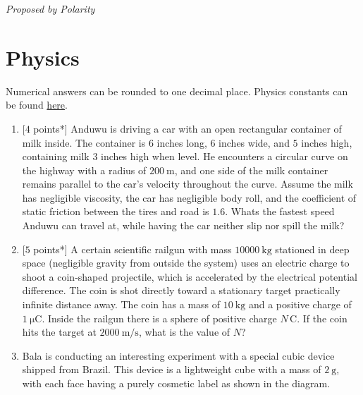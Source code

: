 \begin{enumerate}[align=left,start=1,label=\textbf{\textcolor{meablue}{Problem \arabic*}}]
    \textrm{\emph{Proposed by Polarity}}

    \begin{solution}
        
    \end{solution}
\end{enumerate}
 
\newpage 
{}

\section*{\textsf{\textbf{\textcolor{meared}{Physics}}}}
Numerical answers can be rounded to one decimal place. Physics constants can be found \href{https://en.wikipedia.org/wiki/List_of_physical_constants}{here}.
\begin{enumerate}[align=left,start=1,label=\textbf{\textcolor{meared}{Problem \arabic*}}]
    \item {[$4$ points*]}
        Anduwu is driving a car with an open rectangular container of milk inside. The container is $6$ inches long, $6$ inches wide, and $5$ inches high, containing milk $3$ inches high when level. He encounters a circular curve on the highway with a radius of $\qty{200}{\meter}$, and one side of the milk container remains parallel to the car's velocity throughout the curve. Assume the milk has negligible viscosity, the car has negligible body roll, and the coefficient of static friction between the tires and road is $1.6$. Whats the fastest speed Anduwu can travel at, while having the car neither slip nor spill the milk?
    \item {[$5$ points*]} 
         A certain scientific railgun with mass $\qty{10000}{\kilo\gram}$ stationed in deep space (negligible gravity from outside the system) uses an electric charge to shoot a coin-shaped projectile, which is accelerated by the electrical potential difference. The coin is shot directly toward a stationary target practically infinite distance away. The coin has a mass of $\qty{10}{\kilo\gram}$ and a positive charge of $\qty{1}{\micro\coulomb}$. Inside the railgun there is a sphere of positive charge $N\,\unit{\coulomb}$. If the coin hits the target at $\qty[per-mode = symbol]{2000}{\meter\per\second}$, what is the value of $N$?
    \item
        Bala is conducting an interesting experiment with a special cubic device shipped from Brazil. This device is a lightweight cube with a mass of $\qty{2}{\gram}$, with each face having a purely cosmetic label as shown in the diagram.

\end{enumerate}
